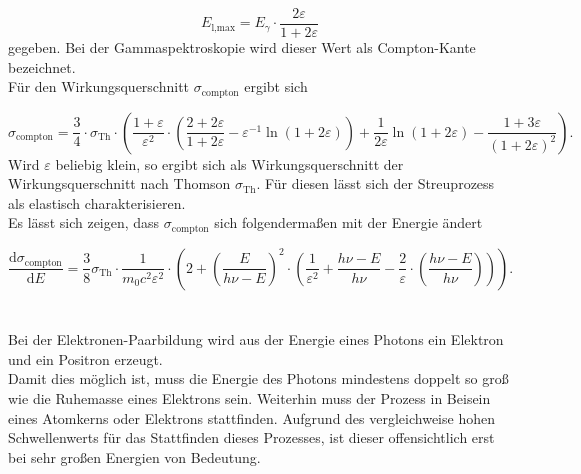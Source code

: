 \begin{equation}
  \label{eqn:ckante}
  E_\text{l,max} = E_\gamma \cdot \frac{2\varepsilon}{1 + 2\varepsilon}
\end{equation}
gegeben. Bei der Gammaspektroskopie wird dieser Wert als Compton-Kante bezeichnet.\\
Für den Wirkungsquerschnitt $\sigma_\text{compton}$ ergibt sich

\begin{equation}
  \label{eqn:comptonquerschnitt}
  \sigma_\text{compton} = \frac{3}{4} \cdot \sigma_\text{Th}
  \cdot \left( \frac{1 + \varepsilon}{\varepsilon^2}
  \cdot \left( \frac{2 + 2\varepsilon}{1 + 2\varepsilon} - \varepsilon^{-1} \ln\left( 1 + 2\varepsilon \right) \right)
  + \frac{1}{2\varepsilon} \ln\left( 1 + 2\varepsilon \right) - \frac{1 + 3\varepsilon}{(1 + 2\varepsilon)^2}  \right) .
\end{equation}
Wird $\varepsilon$ beliebig klein, so ergibt sich als Wirkungsquerschnitt der Wirkungsquerschnitt nach Thomson
$\sigma_\text{Th}$. Für diesen lässt sich der Streuprozess als elastisch charakterisieren.\\
Es lässt sich zeigen, dass $\sigma_\text{compton}$ sich folgendermaßen mit der Energie ändert

\begin{equation}
  \label{eqn:dsig}
  \frac{\mathrm{d}\sigma_\text{compton}}{\mathrm{d}E} = \frac{3}{8} \sigma_\text{Th}
  \cdot \frac{1}{m_{0} c^2 \varepsilon^2} \cdot \left(  2 + \left( \frac{E}{h\nu - E} \right)^2
  \cdot \left( \frac{1}{\varepsilon^2} + \frac{h\nu - E}{h\nu} - \frac{2}{\varepsilon}
  \cdot \left( \frac{h\nu - E}{h\nu} \right) \right) \right) .
\end{equation}
\\ \\
Bei der Elektronen-Paarbildung wird aus der Energie eines Photons ein Elektron und ein Positron erzeugt.\\
Damit dies möglich ist, muss die Energie des Photons mindestens doppelt so groß wie die Ruhemasse eines Elektrons
sein. Weiterhin muss der Prozess in Beisein eines Atomkerns oder Elektrons stattfinden. Aufgrund des vergleichweise
hohen Schwellenwerts für das Stattfinden dieses Prozesses, ist dieser offensichtlich erst bei sehr großen Energien
von Bedeutung.

